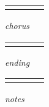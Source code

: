 \documentclass[12pt]{article}
\begin{document}
\begin{tabular}{|P{1.25in}|P{1.25in}|P{1.25in}|P{1.25in}|}
    &   &   &   \\
\end{tabular}

\textit{chorus}

\begin{tabular}{|P{1.25in}|P{1.25in}|P{1.25in}|P{1.25in}|}
    &   &   &   \\
\end{tabular}

\textit{ending}

\begin{tabular}{|P{1.25in}|P{1.25in}|P{1.25in}|P{1.25in}|}
    &   &   &   \\
\end{tabular}

\textit{notes}

\newpage
\end{document}
